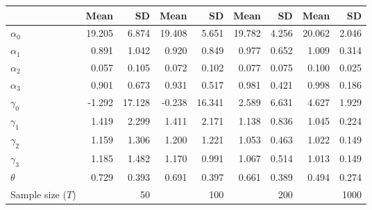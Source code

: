 
\begin{tabular}[t]{lrrrrrrrr}
\toprule
  & Mean & SD & Mean  & SD  & Mean   & SD   & Mean    & SD   \\
\midrule
$\alpha_{0}$ & 19.205 & 6.874 & 19.408 & 5.651 & 19.782 & 4.256 & 20.062 & 2.046\\
$\alpha_{1}$ & 0.891 & 1.042 & 0.920 & 0.849 & 0.977 & 0.652 & 1.009 & 0.314\\
$\alpha_{2}$ & 0.057 & 0.105 & 0.072 & 0.102 & 0.077 & 0.075 & 0.100 & 0.025\\
$\alpha_{3}$ & 0.901 & 0.673 & 0.931 & 0.517 & 0.981 & 0.421 & 0.998 & 0.186\\
$\gamma_{0}$ & -1.292 & 17.128 & -0.238 & 16.341 & 2.589 & 6.631 & 4.627 & 1.929\\
$\gamma_{1}$ & 1.419 & 2.299 & 1.411 & 2.171 & 1.138 & 0.836 & 1.045 & 0.224\\
$\gamma_{2}$ & 1.159 & 1.306 & 1.200 & 1.221 & 1.053 & 0.463 & 1.022 & 0.149\\
$\gamma_{3}$ & 1.185 & 1.482 & 1.170 & 0.991 & 1.067 & 0.514 & 1.013 & 0.149\\
$\theta$ & 0.729 & 0.393 & 0.691 & 0.397 & 0.661 & 0.389 & 0.494 & 0.274\\
Sample size ($T$) &  & 50 &  & 100 &  & 200 &  & 1000\\
\bottomrule
\end{tabular}
